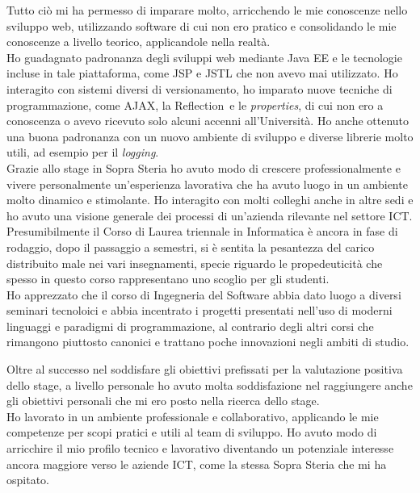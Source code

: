 Tutto ciò mi ha permesso di imparare molto, arricchendo le mie conoscenze nello sviluppo web, utilizzando software di cui non ero pratico e consolidando le mie conoscenze a livello teorico, applicandole nella realtà.\\

Ho guadagnato padronanza degli sviluppi web mediante Java EE e le tecnologie incluse in tale piattaforma, come JSP e JSTL che non avevo mai utilizzato. Ho interagito con sistemi diversi di versionamento, ho imparato nuove tecniche di programmazione, come AJAX\glossario , la Reflection\glossario\ e le \textit{properties}, di cui non ero a conoscenza o avevo ricevuto solo alcuni accenni all'Università. Ho anche ottenuto una buona padronanza con un nuovo ambiente di sviluppo e diverse librerie molto utili, ad esempio per il \textit{logging}.\\

Grazie allo stage in Sopra Steria ho avuto modo di crescere professionalmente e vivere personalmente un'esperienza lavorativa che ha avuto luogo in un ambiente molto dinamico e stimolante. Ho interagito con molti colleghi anche in altre sedi e ho avuto una visione generale dei processi di un'azienda rilevante nel settore ICT\glossario .\\

Presumibilmente il Corso di Laurea triennale in Informatica è ancora in fase di rodaggio, dopo il passaggio a semestri, si è sentita la pesantezza del carico distribuito	male nei vari insegnamenti, specie riguardo le propedeuticità che spesso in questo corso rappresentano uno scoglio per gli studenti.\\

Ho apprezzato che il corso di Ingegneria del Software abbia dato luogo a diversi seminari tecnoloici e abbia incentrato i progetti presentati nell'uso di moderni linguaggi e paradigmi di programmazione, al contrario degli altri corsi che rimangono piuttosto canonici e trattano poche innovazioni negli ambiti di studio.

\newpage
Oltre al successo nel soddisfare gli obiettivi prefissati per la valutazione positiva dello stage, a livello personale ho avuto molta soddisfazione nel raggiungere anche gli obiettivi	personali che mi ero posto nella ricerca dello stage.\\

Ho lavorato in un ambiente professionale e collaborativo, applicando le mie competenze per scopi pratici e utili al team di sviluppo. Ho avuto modo di arricchire il mio profilo tecnico e lavorativo diventando un potenziale interesse ancora maggiore verso le aziende ICT\glossario , come la stessa Sopra Steria che mi ha ospitato.\\

